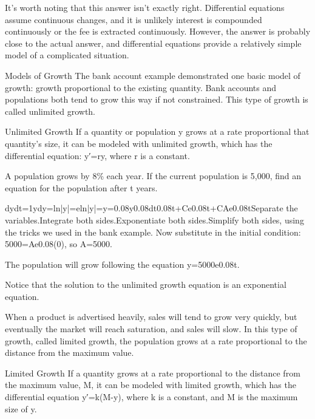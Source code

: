 It's worth noting that this answer isn't exactly right. Differential equations assume continuous changes, and it is unlikely interest is compounded continuously or the fee is extracted continuously. However, the answer is probably close to the actual answer, and differential equations provide a relatively simple model of a complicated situation.

Models of Growth
The bank account example demonstrated one basic model of growth: growth proportional to the existing quantity. Bank accounts and populations both tend to grow this way if not constrained. This type of growth is called unlimited growth.

Unlimited Growth
If a quantity or population y grows at a rate proportional that quantity's size, it can be modeled with unlimited growth, which has the differential equation:
y′=ry,
where r is a constant.

\begin{example}
A population grows by 8\% each year. If the current population is 5,000, find an equation for the population after t years.

\begin{solution}
dydt=1ydy=ln|y|=eln|y|=y=0.08y0.08dt0.08t+Ce0.08t+CAe0.08tSeparate the variables.Integrate both sides.Exponentiate both sides.Simplify both sides, using the tricks we used in the bank example.
Now substitute in the initial condition: 5000=Ae0.08(0), so A=5000.

The population will grow following the equation
y=5000e0.08t.
\end{solution}\end{example}

Notice that the solution to the unlimited growth equation is an exponential equation.

When a product is advertised heavily, sales will tend to grow very quickly, but eventually the market will reach saturation, and sales will slow. In this type of growth, called limited growth, the population grows at a rate proportional to the distance from the maximum value.

Limited Growth
If a quantity grows at a rate proportional to the distance from the maximum value, M, it can be modeled with limited growth, which has the differential equation
y′=k(M-y),
where k is a constant, and M is the maximum size of y.

